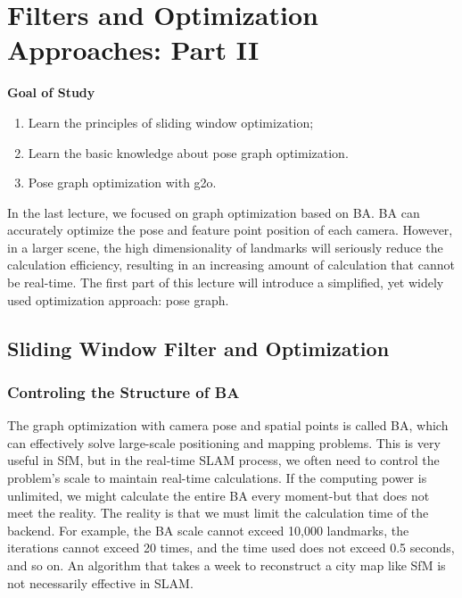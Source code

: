 \chapter{Filters and Optimization Approaches: Part II}
\label{cpt:backend2}
\begin{mdframed}  
	\textbf{Goal of Study}
	\begin{enumerate}[labelindent=0em,leftmargin=1.5em]
		\item Learn the principles of sliding window optimization; 
		\item Learn the basic knowledge about pose graph optimization.
		\item Pose graph optimization with g2o. 
	\end{enumerate}
\end{mdframed}

In the last lecture, we focused on graph optimization based on BA. BA can accurately optimize the pose and feature point position of each camera. However, in a larger scene, the high dimensionality of landmarks will seriously reduce the calculation efficiency, resulting in an increasing amount of calculation that cannot be real-time. The first part of this lecture will introduce a simplified, yet widely used optimization approach: pose graph.

\newpage
\section{Sliding Window Filter and Optimization}
\subsection{Controling the Structure of BA}

The graph optimization with camera pose and spatial points is called BA, which can effectively solve large-scale positioning and mapping problems. This is very useful in SfM, but in the real-time SLAM process, we often need to control the problem's scale to maintain real-time calculations. If the computing power is unlimited, we might calculate the entire BA every moment-but that does not meet the reality. The reality is that we must limit the calculation time of the backend. For example, the BA scale cannot exceed 10,000 landmarks, the iterations cannot exceed 20 times, and the time used does not exceed 0.5 seconds, and so on. An algorithm that takes a week to reconstruct a city map like SfM is not necessarily effective in SLAM.


